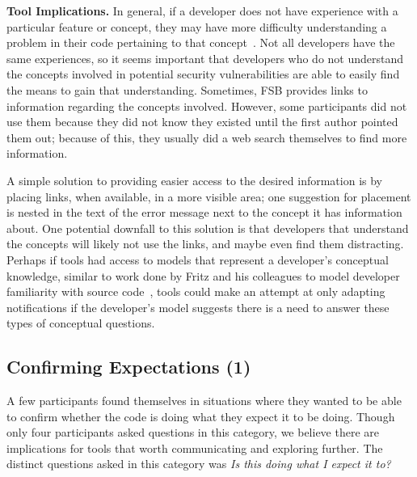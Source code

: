 \documentclass[conference]{IEEEtran}
\begin{document}
\noindent\textbf{Tool Implications.}
In general, if a developer does not have experience with a particular feature or concept, they may have more difficulty understanding a problem in their code pertaining to that concept~\cite{wiedenbeck1993mental}.
Not all developers have the same experiences, so it seems important that developers who do not understand the concepts involved in potential security vulnerabilities are able to easily find the means to gain that understanding.
Sometimes, FSB provides links to information regarding the concepts involved. 
However, some participants did not use them because they did not know they existed until the first author pointed them out; because of this, they usually did a web search themselves to find more information.

A simple solution to providing easier access to the desired information is by placing links, when available, in a  more visible area; one suggestion for placement is nested in the text of the error message next to the concept it has information about. 
One potential downfall to this solution is that developers that understand the concepts will likely not use the links, and maybe even find them distracting.   
Perhaps if tools had access to models that represent a developer's conceptual knowledge, similar to work done by Fritz and his colleagues to model developer familiarity with source code~\cite{fritz2010degree}, tools could make an attempt at only adapting notifications if the developer's model suggests there is a need to answer these types of conceptual questions.


\noindent\subsection{\textbf{Confirming Expectations (1)}}\label{ce}

A few participants found themselves in situations where they wanted to be able to confirm whether the code is doing what they expect it to be doing. 
Though only four participants asked questions in this category, we believe there are implications for tools that worth communicating and exploring further. 
The distinct questions asked in this category was \textit{Is this doing what I expect it to?} 
\\
\end{document}
